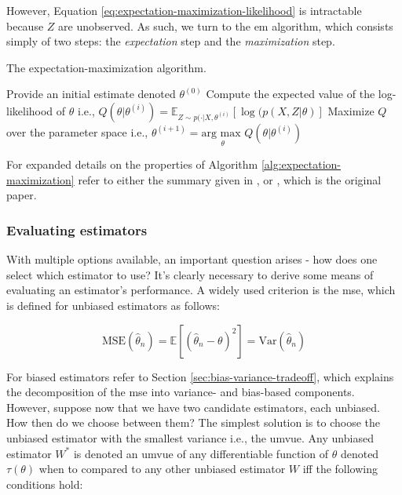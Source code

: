 \documentclass{report}
\begin{document}
However, Equation \ref{eq:expectation-maximization-likelihood} is intractable because $Z$ are unobserved. As such, we turn to the \gls{em} algorithm, which consists simply of two steps: the \textit{expectation} step and the \textit{maximization} step. 

\begin{algorithm}[h!]
    \caption{The expectation-maximization algorithm.}\label{alg:expectation-maximization}
    \begin{algorithmic}[1]
        \STATE Provide an initial estimate denoted $\theta^{(0)}$
            \STATE Compute the expected value of the log-likelihood of $\theta$ i.e., $Q(\theta | \theta^{(i)}) = \mathbb{E}_{Z\sim p(\cdot | X, \theta^{(i)}}\left[\log(p(X,Z|\theta)\right]$
            \STATE Maximize $Q$ over the parameter space i.e., $\theta^{(i+1)} = \underset{\theta}{\text{arg max }} Q(\theta | \theta^{(i)})$
        \ENDFOR
    \end{algorithmic}
\end{algorithm}

For expanded details on the properties of Algorithm \ref{alg:expectation-maximization} refer to either the summary given in \cite[Chapter~7.2.4]{casella_statistical_2002}, or \cite{dempster_maximum_1977}, which is the original paper. 

\subsubsection{Evaluating estimators}

With multiple options available, an important question arises - how does one select which estimator to use? It's clearly necessary to derive some means of evaluating an estimator's performance. A widely used criterion is the \gls{mse}, which is defined for unbiased estimators as follows:

\begin{equation}\label{eq:mse}
    \text{MSE}\left(\hat{\theta}_n\right) = \mathbb{E}\left[\left(\hat{\theta}_n - \theta\right)^2\right] = \text{Var}\left(\hat{\theta}_n\right)
\end{equation}

For biased estimators refer to Section \ref{sec:bias-variance-tradeoff}, which explains the decomposition of the \gls{mse} into variance- and bias-based components. However, suppose now that we have two candidate estimators, each unbiased. How then do we choose between them? The simplest solution is to choose the unbiased estimator with the smallest variance i.e., the \gls{umvue}. Any unbiased estimator $W^*$ is denoted an \gls{umvue} of any differentiable function of $\theta$ denoted $\tau(\theta)$ when to compared to any other unbiased estimator $W$ \gls{iff} the following conditions hold:
\end{document}
